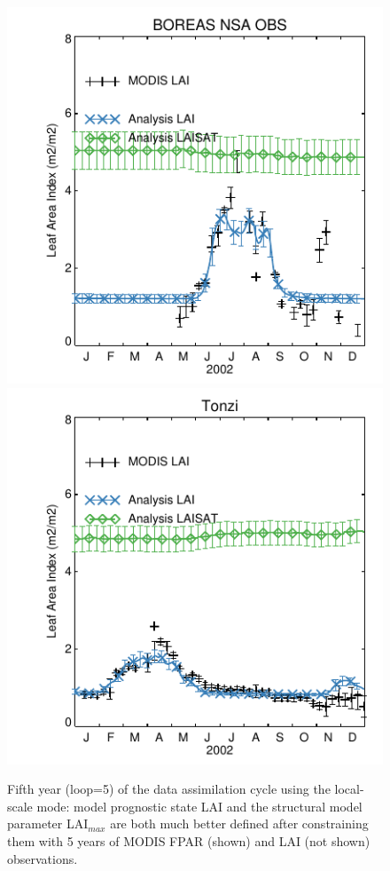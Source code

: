 \documentclass[a4paper,12pt]{article}
\begin{document}
\begin{figure}[hp]
\begin{center}
\includegraphics[scale=1.0]{BOREAS_NSA_OBS.dayplot.2002.LAI.MODIS.pdf}
\includegraphics[scale=1.0]{Tonzi.dayplot.2002.LAI.MODIS.pdf}
\caption{Fifth year (loop=5) of the data assimilation cycle using the local-scale mode: model prognostic state LAI and the structural model parameter LAI$_{max}$ are both much better defined after constraining them with 5 years of MODIS FPAR (shown) and LAI (not shown) observations.}
\label{figure: local 3}
\end{center}
\end{figure}
\end{document}
